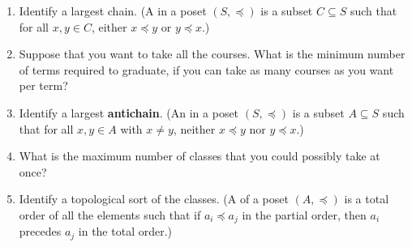 \documentclass[12pt]{article}
\newcommand{\mfigure}[3]{\bigskip\centerline{\resizebox{#1}{#2}{\texttt{[image: \#3]}}}\bigskip}
\begin{document}
\begin{enumerate}
\begin{enumerate}
\solution[\vspace{3in}]{
\ \\
\mfigure{!}{2.5in}{rec10-hasse}
}

\item Identify a largest chain.  (A  in a poset $(S,
\preceq)$ is a subset $C \subseteq S$ such that for all $x, y \in C$,
either $x \preceq y$ or $y \preceq x$.)


\item Suppose that you want to take all the courses.  What is the
minimum number of terms required to graduate, if you can take as many
courses as you want per term?


\item Identify a largest \textbf{antichain}.  (An  in
a poset $(S, \preceq)$ is a subset $A \subseteq S$ such that for all
$x, y \in A$ with $x\ne y$, neither $x \preceq y$ nor $y \preceq x$.)


\item What is the maximum number of classes that you could possibly
take at once?


\item Identify a topological sort of the classes.  (A
 of a poset $(A, \preceq)$ is a total order of
all the elements such that if $a_i \preceq a_j$ in the partial order,
then $a_i$ precedes $a_j$ in the total order.)



\end{enumerate}
\end{enumerate}
\end{document}
